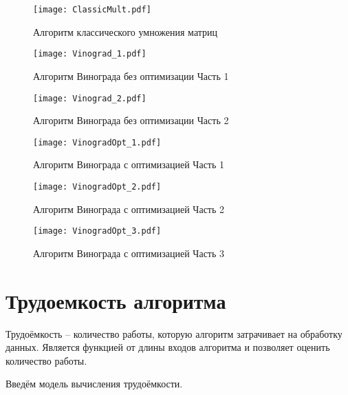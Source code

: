        	    \begin{figure}[h!]
       		\centering
       		\texttt{[image: ClassicMult.pdf]}
       		\caption{Алгоритм классического умножения матриц}
       		\label{schema:ClassicMult}
       	\end{figure}\clearpage
       	
       	\begin{figure}[h!]
            \centering
            \texttt{[image: Vinograd\_1.pdf]}
            \caption{Алгоритм Винограда без оптимизации Часть 1}
            \label{schema:Vinograd_1}
        \end{figure}\clearpage

        \begin{figure}[h!]
            \centering
            \texttt{[image: Vinograd\_2.pdf]}
            \caption{Алгоритм Винограда без оптимизации Часть 2}
        \end{figure}\clearpage

        \begin{figure}[h!]
            \centering
            \texttt{[image: VinogradOpt\_1.pdf]}
            \caption{Алгоритм Винограда с оптимизацией Часть 1}
            \label{schema:Vinograd_Opt}
        \end{figure}\clearpage

        \begin{figure}[h!]
            \centering
            \texttt{[image: VinogradOpt\_2.pdf]}
            \caption{Алгоритм Винограда с оптимизацией Часть 2}
        \end{figure}\clearpage

        \begin{figure}[h!]
            \centering
            \texttt{[image: VinogradOpt\_3.pdf]}
            \caption{Алгоритм Винограда с оптимизацией Часть 3}
        \end{figure}\clearpage
  	
    \section{Трудоемкость алгоритма}
    \par Трудоёмкость – количество работы, которую алгоритм затрачивает на обработку данных. Является функцией от длины входов алгоритма и позволяет оценить количество работы.
    \par Введём модель вычисления трудоёмкости.

